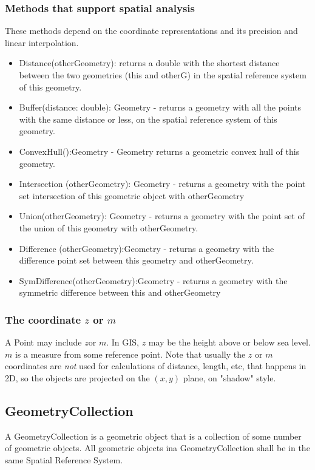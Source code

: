 \documentclass[11pt]{article}
\begin{document}
\subsubsection{Methods that support spatial analysis}
These methods depend on the coordinate representations and its precision and linear interpolation.
\begin{itemize}
\item Distance(otherGeometry): returns a double with the shortest distance between the two geometries (this and otherG) in the spatial reference system of this geometry. 
\item Buffer(distance: double): Geometry - returns a geometry with all the points with the same distance or less, on the spatial reference system of this geometry.
\item ConvexHull():Geometry -  Geometry returns a geometric convex hull of this geometry.
\item Intersection (otherGeometry): Geometry - returns a geometry with the point set intersection of this geometric object with otherGeometry
\item Union(otherGeometry): Geometry - returns a geometry with the point set of the union of this geometry with otherGeometry.
\item Difference (otherGeometry):Geometry -  returns a geometry with the difference point set between this geometry and otherGeometry.
\item SymDifference(otherGeometry):Geometry -  returns a geometry with the symmetric difference between this and otherGeometry
\end{itemize}

\subsubsection{The coordinate $z$ or $m$}
A Point may include $z$or $m$. In GIS, $z$ may be the height above or below sea level. $m$ is a measure from some reference point. Note that usually the $z$ or $m$ coordinates are \textit{not} used for calculations of distance, length, etc, that happens in 2D, so the objects are projected on the $(x,y)$ plane, on "shadow" style.

\subsection{GeometryCollection}
A GeometryCollection is a geometric object that is a collection of some number of geometric objects. All geometric objects ina GeometryCollection shall be in the same Spatial Reference System.
\end{document}
